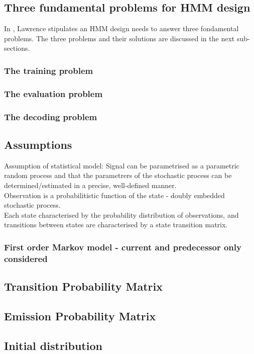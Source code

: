 \subsection{Three fundamental problems for HMM design}
In %
, Lawrence stipulates an HMM design needs to answer three fondamental problems. The three problems and their solutions are discussed in the next sub-sections. 

\subsubsection{The training problem}
\subsubsection{The evaluation problem}
\subsubsection{The decoding problem}

\subsection{Assumptions}
Assumption of statistical model: Signal can be parametrised as a parametric random process and that the parametrers of the stochastic process can be determined/estimated in a precise, well-defined manner.\\
Observation is a probabilitistic function of the state - doubly embedded stochastic process.\\
Each state characterised by the probability distribution of observations, and transitions between states are characterised by a state transition matrix.
\subsubsection{First order Markov model - current and predecessor only considered}
\subsection{Transition Probability Matrix}
\subsection{Emission Probability Matrix}
\subsection{Initial distribution}
